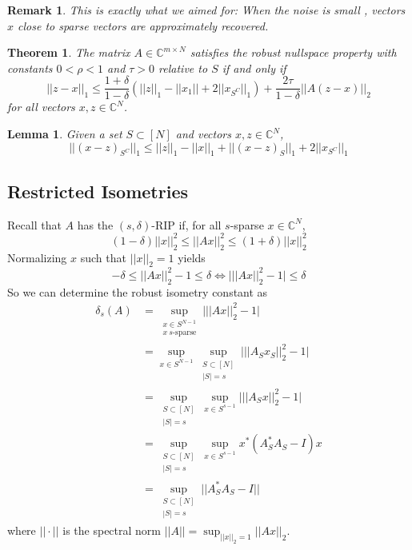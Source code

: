 \documentclass[10pt,a4paper]{article}
\theoremstyle{thmstyle}
\newtheorem{lemma}{Lemma}
\newtheorem{theorem}{Theorem}
\newtheorem{remark}{Remark}
\begin{document}
\begin{remark}
  This is exactly what we aimed for: When the noise is small , vectors $x$ close to sparse vectors are approximately recovered.
\end{remark}

\begin{theorem}
  The matrix $A \in \mathbb{C}^{m \times N}$ satisfies the robust nullspace property with constants $0 < \rho < 1$ and $\tau > 0$ relative to $S$ if and only if
  \begin{equation*}
    ||z - x||_{1} \le \frac{1 + \delta}{1 - \delta} \left( ||z||_{1} - ||x_{1}|| + 2 ||x_{S^{C}}||_{1} \right) + \frac{2\tau}{1 - \delta} ||A(z - x)||_{2}
  \end{equation*}
  for all vectors $x, z \in \mathbb{C}^{N}$.
\end{theorem}

\begin{lemma}
  Given a set $S \subset [N]$ and vectors $x, z \in \mathbb{C}^{N}$,
  \begin{equation*}
    ||(x - z)_{S^{C}}||_{1} \le ||z||_{1} - ||x||_{1} + ||(x - z)_{S}||_{1} + 2||x_{S^{C}}||_{1}
  \end{equation*}
\end{lemma}

\subsection{Restricted Isometries}

Recall that $A$ has the $(s, \delta)$-RIP if, for all $s$-sparse $x \in \mathbb{C}^{N}$,
\begin{equation*}
  (1 - \delta)||x||_{2}^{2} \le ||Ax||_{2}^{2} \le (1 + \delta) ||x||_{2}^{2}
\end{equation*}
Normalizing $x$ such that $||x||_{2} = 1$ yields
\begin{equation*}
  -\delta \le ||Ax||_{2}^{2} - 1 \le \delta \Leftrightarrow \big| ||Ax||_{2}^{2} - 1 \big| \le \delta
\end{equation*}
So we can determine the robust isometry constant as
\begin{align*}
  \delta_{s}(A) & = \sup_{\substack{x \in S^{N - 1}\\x~\text{$s$-sparse}}} \big| ||Ax||_{2}^{2} - 1 \big|\\
                & = \sup_{x \in S^{N - 1}} \sup_{\substack{S \subset [N]\\|S| = s}} \big| ||A_{S}x_{S}||_{2}^{2} - 1 \big|\\
                & = \sup_{\substack{S \subset [N]\\|S| = s}} \sup_{x \in S^{s - 1}} \big| ||A_{S}x||_{2}^{2} - 1 \big|\\
                & = \sup_{\substack{S \subset [N]\\|S| = s}} \sup_{x \in S^{s - 1}} x^{*}(A_{S}^{*}A_{S} - I)x\\
                & = \sup_{\substack{S \subset [N]\\|S| = s}} ||A_{S}^{*}A_{S} - I||
\end{align*}
where $||\cdot||$ is the spectral norm $||A|| = \sup_{||x||_{2} = 1} ||Ax||_{2}$.
\end{document}
